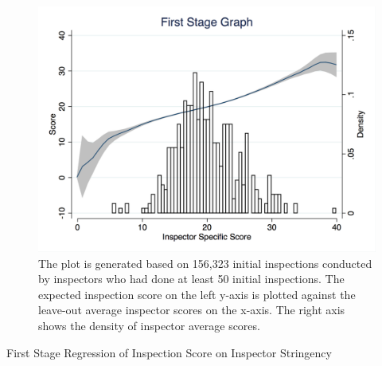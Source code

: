 \documentclass[11pt]{article}
\begin{document}

\begin{figure}[h!]
\centering
\includegraphics[scale = 0.65]{Figures/first_stage_score.png}
\caption{The plot is generated based on 156,323 initial inspections conducted by inspectors who had done at least 50 initial inspections. The expected inspection score on the left y-axis is plotted against the leave-out average inspector scores on the x-axis. The right axis shows the density of inspector average scores.}
\label{first_stage_fig}
\end{figure}

\newpage

\begin{table}[h!]
\centering
\subfloat[Full]{}


\subfloat[Re-inspections]{}
\caption{First Stage Regression of Inspection Score on Inspector Stringency}
\label{first_stage_reg}
\end{table}
\end{document}
